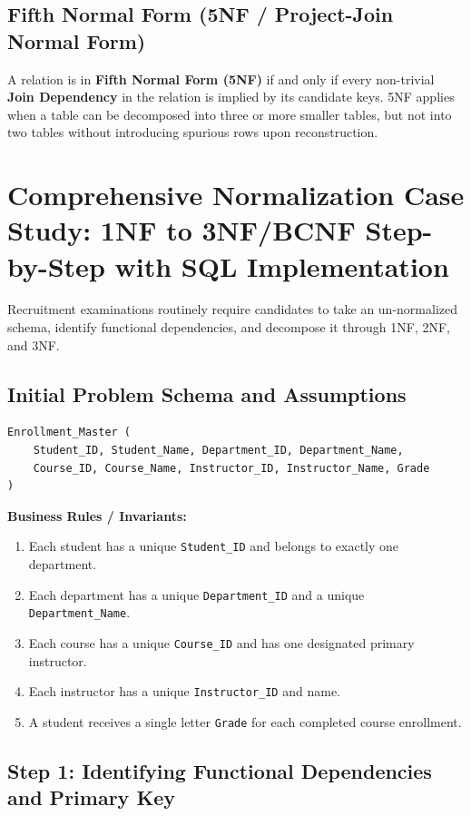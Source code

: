 \subsection{Fifth Normal Form (5NF / Project-Join Normal Form)}

A relation is in \textbf{Fifth Normal Form (5NF)} if and only if every non-trivial \textbf{Join Dependency} in the relation is implied by its candidate keys. 5NF applies when a table can be decomposed into three or more smaller tables, but not into two tables without introducing spurious rows upon reconstruction.

\newpage
\section{Comprehensive Normalization Case Study: 1NF to 3NF/BCNF Step-by-Step with SQL Implementation}

Recruitment examinations routinely require candidates to take an un-normalized schema, identify functional dependencies, and decompose it through 1NF, 2NF, and 3NF.

\subsection{Initial Problem Schema and Assumptions}

\begin{lstlisting}[language=SQL]
Enrollment_Master (
    Student_ID, Student_Name, Department_ID, Department_Name,
    Course_ID, Course_Name, Instructor_ID, Instructor_Name, Grade
)
\end{lstlisting}

\textbf{Business Rules / Invariants:}
\begin{enumerate}
\item Each student has a unique \texttt{Student\_ID} and belongs to exactly one department.
\item Each department has a unique \texttt{Department\_ID} and a unique \texttt{Department\_Name}.
\item Each course has a unique \texttt{Course\_ID} and has one designated primary instructor.
\item Each instructor has a unique \texttt{Instructor\_ID} and name.
\item A student receives a single letter \texttt{Grade} for each completed course enrollment.
\end{enumerate}

\subsection{Step 1: Identifying Functional Dependencies and Primary Key}

